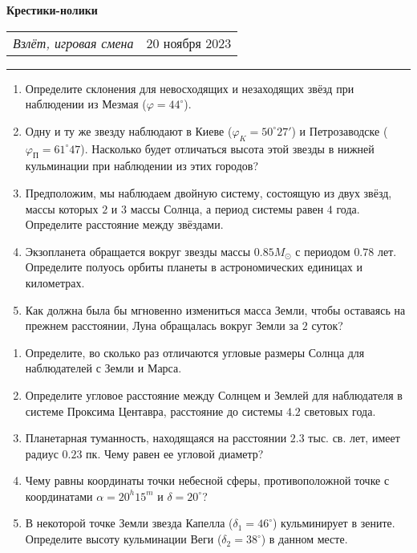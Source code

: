 \documentclass[12pt]{article}
\begin{document}
\begin{center}
	\textbf{\LARGE{Крестики-нолики}}
\end{center}
\begin{tabularx}{\textwidth}{Xr}
	{\textit{Взлёт, игровая смена}} & $20$ ноября $2023$ \\
\end{tabularx}

\noindent\rule{\textwidth}{0.4pt}

\begin{enumerate}[label=\textbf{A\arabic*.}]
	\item Определите склонения для невосходящих и незаходящих звёзд при наблюдении из Мезмая ($\varphi = 44^{\circ}$).
    \item Одну и ту же звезду наблюдают в Киеве ($\varphi_K = 50^{\circ}27'$) и Петрозаводске ($\varphi_{\text{П}} = 61^{\circ}47$). Насколько будет отличаться высота этой звезды в нижней кульминации при наблюдении из этих городов?
    \item Предположим, мы наблюдаем двойную систему, состоящую из двух звёзд, массы которых $2$ и $3$ массы Солнца, а период системы равен $4$ года. Определите расстояние между звёздами.
    \item Экзопланета обращается вокруг звезды массы $0.85 M_{\odot}$ с периодом $0.78$ лет. Определите полуось орбиты планеты в астрономических единицах и километрах.
    \item Как должна была бы мгновенно измениться масса Земли, чтобы оставаясь на прежнем расстоянии, Луна обращалась вокруг Земли за $2$ суток? %
	
\end{enumerate}

\begin{enumerate}[label=\textbf{B\arabic*.}]
	\item Определите, во сколько раз отличаются угловые размеры Солнца для наблюдателей с Земли и Марса. %
    \item Определите угловое расстояние между Солнцем и Землей для наблюдателя в системе Проксима Центавра, расстояние до системы $4.2$ световых года. %
    \item Планетарная туманность, находящаяся на расстоянии $2.3$ тыс. св. лет, имеет радиус $0.23$ пк. Чему равен ее угловой диаметр? %
    \item Чему равны координаты точки небесной сферы, противоположной точке с координатами $\alpha = 20^h15^m$ и $\delta = 20^{\circ}$? %
    \item В некоторой точке Земли звезда Капелла ($\delta_1 = 46^{\circ}$) кульминирует в зените. Определите высоту кульминации Веги ($\delta_2 = 38^{\circ}$) в данном месте. %
\end{enumerate}
\end{document}
